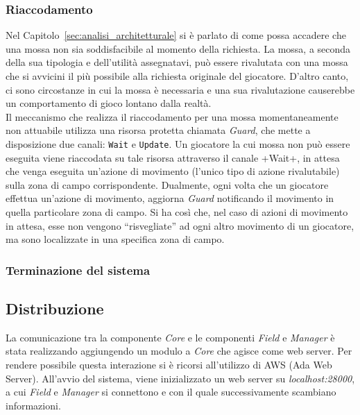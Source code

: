 \subsubsection{Riaccodamento}
\label{sec:implementazione_concorrenza_riaccodamento}

Nel Capitolo~\ref{sec:analisi_architetturale} si è parlato di come possa accadere che una mossa non sia soddisfacibile al momento della richiesta. La mossa, a seconda della sua tipologia e dell'utilità assegnatavi, può essere rivalutata con una mossa che si avvicini il più possibile alla richiesta originale del giocatore. D'altro canto, ci sono circostanze in cui la mossa è necessaria e una sua rivalutazione causerebbe un comportamento di gioco lontano dalla realtà.\\

Il meccanismo che realizza il riaccodamento per una mossa momentaneamente non attuabile utilizza una risorsa protetta chiamata \emph{Guard}, che mette a disposizione due canali: \verb+Wait+ e \verb+Update+. Un giocatore la cui mossa non può essere eseguita viene riaccodata su tale risorsa attraverso il canale \ver+Wait+, in attesa che venga eseguita un'azione di movimento (l'unico tipo di azione rivalutabile) sulla zona di campo corrispondente. Dualmente, ogni volta che un giocatore effettua un'azione di movimento, aggiorna \emph{Guard} notificando il movimento in quella particolare zona di campo. Si ha così che, nel caso di azioni di movimento in attesa, esse non vengono ``risvegliate'' ad ogni altro movimento di un giocatore, ma sono localizzate in una specifica zona di campo.\\

\subsubsection{Terminazione del sistema}
\label{sec:implementazione_concorrenza_terminazione_sistema}



\subsection{Distribuzione}
\label{sec:implementazione_distribuzione}

La comunicazione tra la componente \emph{Core} e le componenti \emph{Field} e \emph{Manager} è stata realizzando aggiungendo un modulo a \emph{Core} che agisce come web server. Per rendere possibile questa interazione si è ricorsi all'utilizzo di AWS (Ada Web Server). All'avvio del sistema, viene inizializzato un web server su \emph{localhost:28000}, a cui \emph{Field} e \emph{Manager} si connettono e con il quale successivamente scambiano informazioni.\\

